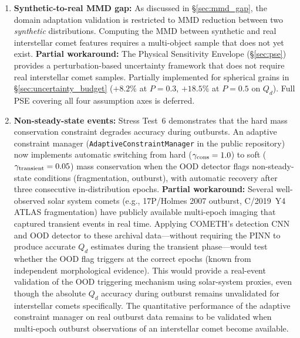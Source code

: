 \documentclass[usenatbib]{mnras}
\begin{document}
\begin{enumerate}
    \item \textbf{Synthetic-to-real MMD gap:} As discussed in \S\ref{sec:mmd_gap}, the domain adaptation validation is restricted to MMD reduction between two \textit{synthetic} distributions. Computing the MMD between synthetic and real interstellar comet features requires a multi-object sample that does not yet exist. \textbf{Partial workaround:} The Physical Sensitivity Envelope (\S\ref{sec:pse}) provides a perturbation-based uncertainty framework that does not require real interstellar comet samples. Partially implemented for spherical grains in \S\ref{sec:uncertainty_budget} ($+8.2\%$ at $P{=}0.3$, $+18.5\%$ at $P{=}0.5$ on $Q_d$). Full PSE covering all four assumption axes is deferred.
    \item \textbf{Non-steady-state events:} Stress Test~6 demonstrates that the hard mass conservation constraint degrades accuracy during outbursts. An adaptive constraint manager (\texttt{AdaptiveConstraintManager} in the public repository) now implements automatic switching from hard ($\gamma_{\rm cons}=1.0$) to soft ($\gamma_{\rm transient}=0.05$) mass conservation when the OOD detector flags non-steady-state conditions (fragmentation, outburst), with automatic recovery after three consecutive in-distribution epochs. \textbf{Partial workaround:} Several well-observed solar system comets (e.g., 17P/Holmes 2007 outburst, C/2019~Y4 ATLAS fragmentation) have publicly available multi-epoch imaging that captured transient events in real time. Applying COMETH's detection CNN and OOD detector to these archival data---without requiring the PINN to produce accurate $Q_d$ estimates during the transient phase---would test whether the OOD flag triggers at the correct epochs (known from independent morphological evidence). This would provide a real-event validation of the OOD triggering mechanism using solar-system proxies, even though the absolute $Q_d$ accuracy during outburst remains unvalidated for interstellar comets specifically. The quantitative performance of the adaptive constraint manager on real outburst data remains to be validated when multi-epoch outburst observations of an interstellar comet become available.

\end{enumerate}
\end{document}
